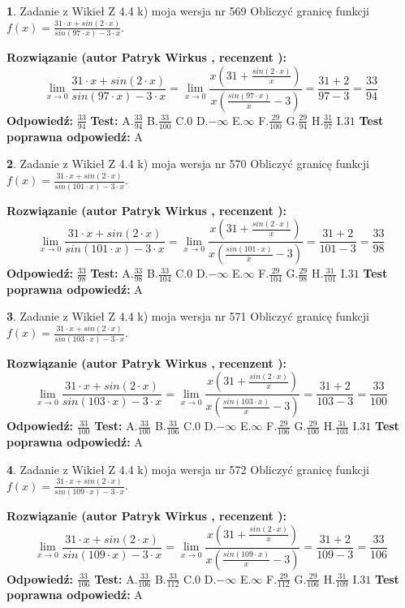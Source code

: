 \documentclass[12pt, a4paper]{article}
\theoremstyle{definition} %
\newtheorem{zad}{}
\newcommand{\zadStart}[1]{\begin{zad}#1\newline}
\newcommand{\zadStop}{\end{zad}}
\newcommand{\rozwStart}[2]{\noindent \textbf{Rozwiązanie (autor #1 , recenzent #2): }\newline}
\newcommand{\rozwStop}{\newline}
\newcommand{\odpStart}{\noindent \textbf{Odpowiedź:}\newline}
\newcommand{\odpStop}{\newline}
\newcommand{\testStart}{\noindent \textbf{Test:}\newline}
\newcommand{\testStop}{\newline}
\newcommand{\kluczStart}{\noindent \textbf{Test poprawna odpowiedź:}\newline}
\newcommand{\kluczStop}{\newline}
\begin{document}
\zadStart{Zadanie z Wikieł Z 4.4 k) moja wersja nr 569}
Obliczyć granicę funkcji $f(x)=\frac{31\cdot x +sin(2\cdot x)}{sin(97\cdot x) -3\cdot x}$.
\zadStop
\rozwStart{Patryk Wirkus}{}
$$\lim\limits_{x\to 0}\frac{31\cdot x +sin(2\cdot x)}{sin(97\cdot x) -3\cdot x}
=\lim\limits_{x\to 0}\frac{x(31+\frac{sin(2\cdot x)}{x})}{x(\frac{sin(97\cdot x)}{x}-3)}
=\frac{31+2}{97-3} = \frac{33}{94}$$
\rozwStop
\odpStart
$\frac{33}{94}$
\odpStop
\testStart
A.$\frac{33}{94}$
B.$\frac{33}{100}$
C.$0$
D.$-\infty$
E.$\infty$
F.$\frac{29}{100}$
G.$\frac{29}{94}$
H.$\frac{31}{97}$
I.$31$
\testStop
\kluczStart
A
\kluczStop



\zadStart{Zadanie z Wikieł Z 4.4 k) moja wersja nr 570}
Obliczyć granicę funkcji $f(x)=\frac{31\cdot x +sin(2\cdot x)}{sin(101\cdot x) -3\cdot x}$.
\zadStop
\rozwStart{Patryk Wirkus}{}
$$\lim\limits_{x\to 0}\frac{31\cdot x +sin(2\cdot x)}{sin(101\cdot x) -3\cdot x}
=\lim\limits_{x\to 0}\frac{x(31+\frac{sin(2\cdot x)}{x})}{x(\frac{sin(101\cdot x)}{x}-3)}
=\frac{31+2}{101-3} = \frac{33}{98}$$
\rozwStop
\odpStart
$\frac{33}{98}$
\odpStop
\testStart
A.$\frac{33}{98}$
B.$\frac{33}{104}$
C.$0$
D.$-\infty$
E.$\infty$
F.$\frac{29}{104}$
G.$\frac{29}{98}$
H.$\frac{31}{101}$
I.$31$
\testStop
\kluczStart
A
\kluczStop



\zadStart{Zadanie z Wikieł Z 4.4 k) moja wersja nr 571}
Obliczyć granicę funkcji $f(x)=\frac{31\cdot x +sin(2\cdot x)}{sin(103\cdot x) -3\cdot x}$.
\zadStop
\rozwStart{Patryk Wirkus}{}
$$\lim\limits_{x\to 0}\frac{31\cdot x +sin(2\cdot x)}{sin(103\cdot x) -3\cdot x}
=\lim\limits_{x\to 0}\frac{x(31+\frac{sin(2\cdot x)}{x})}{x(\frac{sin(103\cdot x)}{x}-3)}
=\frac{31+2}{103-3} = \frac{33}{100}$$
\rozwStop
\odpStart
$\frac{33}{100}$
\odpStop
\testStart
A.$\frac{33}{100}$
B.$\frac{33}{106}$
C.$0$
D.$-\infty$
E.$\infty$
F.$\frac{29}{106}$
G.$\frac{29}{100}$
H.$\frac{31}{103}$
I.$31$
\testStop
\kluczStart
A
\kluczStop



\zadStart{Zadanie z Wikieł Z 4.4 k) moja wersja nr 572}
Obliczyć granicę funkcji $f(x)=\frac{31\cdot x +sin(2\cdot x)}{sin(109\cdot x) -3\cdot x}$.
\zadStop
\rozwStart{Patryk Wirkus}{}
$$\lim\limits_{x\to 0}\frac{31\cdot x +sin(2\cdot x)}{sin(109\cdot x) -3\cdot x}
=\lim\limits_{x\to 0}\frac{x(31+\frac{sin(2\cdot x)}{x})}{x(\frac{sin(109\cdot x)}{x}-3)}
=\frac{31+2}{109-3} = \frac{33}{106}$$
\rozwStop
\odpStart
$\frac{33}{106}$
\odpStop
\testStart
A.$\frac{33}{106}$
B.$\frac{33}{112}$
C.$0$
D.$-\infty$
E.$\infty$
F.$\frac{29}{112}$
G.$\frac{29}{106}$
H.$\frac{31}{109}$
I.$31$
\testStop
\kluczStart
A
\kluczStop
\end{document}
